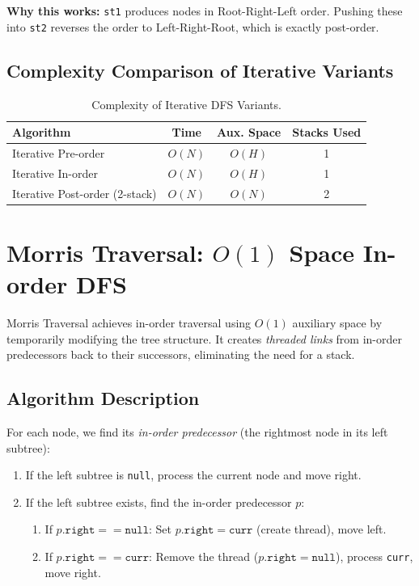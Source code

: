 \documentclass[10pt,journal,compsoc,onecolumn]{IEEEtran}
\begin{document}
\textbf{Why this works:} \texttt{st1} produces nodes in Root-Right-Left order. Pushing these into \texttt{st2} reverses the order to Left-Right-Root, which is exactly post-order.

\subsection{Complexity Comparison of Iterative Variants}

\begin{table}[htbp]
\centering
\caption{Complexity of Iterative DFS Variants.}
\label{tab:iterative_complexity}
\begin{tabular}{lccc}
\toprule
Algorithm & Time & Aux. Space & Stacks Used \\
\midrule
Iterative Pre-order & $O(N)$ & $O(H)$ & 1 \\
Iterative In-order & $O(N)$ & $O(H)$ & 1 \\
Iterative Post-order (2-stack) & $O(N)$ & $O(N)$ & 2 \\
\bottomrule
\end{tabular}
\end{table}

\section{Morris Traversal: $O(1)$ Space In-order DFS}
\label{sec:morris}

Morris Traversal achieves in-order traversal using $O(1)$ auxiliary space by temporarily modifying the tree structure. It creates \emph{threaded links} from in-order predecessors back to their successors, eliminating the need for a stack.

\subsection{Algorithm Description}
For each node, we find its \emph{in-order predecessor} (the rightmost node in its left subtree):
\begin{enumerate}
    \item If the left subtree is \texttt{null}, process the current node and move right.
    \item If the left subtree exists, find the in-order predecessor $p$:
    \begin{enumerate}
        \item If $p.\texttt{right} == \texttt{null}$: Set $p.\texttt{right} = \texttt{curr}$ (create thread), move left.
        \item If $p.\texttt{right} == \texttt{curr}$: Remove the thread ($p.\texttt{right} = \texttt{null}$), process \texttt{curr}, move right.
    \end{enumerate}
\end{enumerate}
\end{document}
